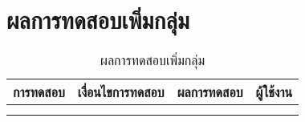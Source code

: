\section{ผลการทดสอบเพิ่มกลุ่ม}
\begin{table}[H]
	\caption{ผลการทดสอบเพิ่มกลุ่ม}
    \centering	
	\label{tab:test26}
    \begin{tabular}{ | p{4cm} | p{4cm} | p{4cm} | p{2cm} | }
		\hline
	\multicolumn{1}{|c|}{การทดสอบ} & \multicolumn{1}{c|}{เงื่อนไขการทดสอบ} & \multicolumn{1}{c|}{ผลการทดสอบ} & \multicolumn{1}{c|}{ผู้ใช้งาน}                             \\ \hline
	\setstretch{1.0}{ทดสอบเพิ่มกลุ่ม}
	& \setstretch{1.0}{ผู้ใช้เปลี่ยนรูปกลุ่ม และเปลี่ยนชื่อกลุ่ม และกดสร้างกลุ่ม}
	& \setstretch{1.0}{ระบบจะบันทึกรูปภาพและชื่อกลุ่ม} 
	&\setstretch{1.0}{\begin{flushleft}ผู้ใช้งาน\end{flushleft}} \\ \cline{2-3} 
	& \setstretch{1.0}{ผู้ใช้ไม่เปลี่ยนรูปกลุ่ม และไม่เปลี่ยนชื่อกลุ่ม และกดสร้างกลุ่ม}
	& \setstretch{1.0}{ระบบจะบันทึกรูปภาพของระบบ และชื่อกลุ่มของระบบ } 
	&\setstretch{1.0}{}\\ \cline{2-3} 
    \end{tabular}
\end{table}

